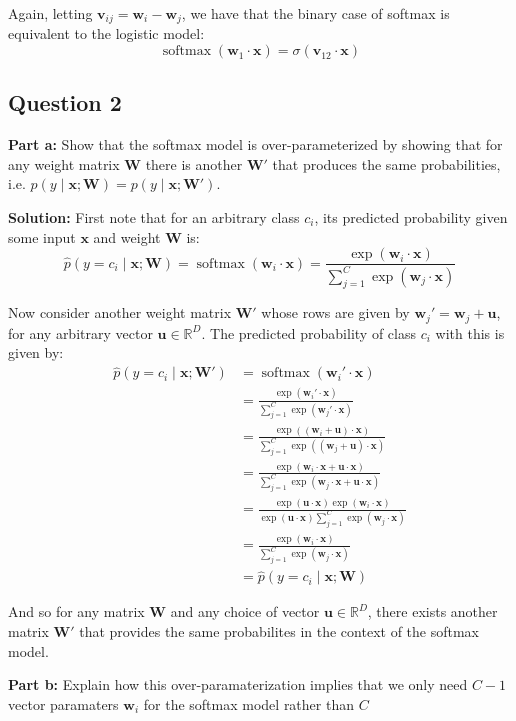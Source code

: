 \documentclass{article}
\renewcommand{\vec}[1]{\mathbf{#1}}
\newcommand{\mat}[1]{\mathbf{#1}}
\begin{document}
Again, letting $\vec v_{ij}=\vec w_i - \vec w_j$, we have that the binary case of softmax is equivalent to the logistic model:
$$\operatorname{softmax}(\vec w_1\cdot\vec x)=\sigma(\vec v_{12}\cdot \vec x)$$

\subsection*{Question 2}
\noindent\textbf{Part a:} Show that the softmax model is over-parameterized by showing that for any weight matrix $\mat W$ there is another $\mat W'$ that produces the same probabilities, i.e. $p(y\mid\vec x; \mat W)=p(y\mid\vec x; \mat W')$.
\bigskip

\noindent\textbf{Solution:} First note that for an arbitrary class $c_i$, its predicted probability given some input $\vec x$ and weight $\mat W$ is:
$$\hat p(y=c_i\mid\vec x;\mat W)=\operatorname{softmax}(\vec w_i\cdot\vec x)=\frac{\exp(\vec w_i\cdot\vec x)}{\sum_{j=1}^C\exp(\vec w_j\cdot\vec x)}$$

Now consider another weight matrix $\mat W'$ whose rows are given by $\vec w_j'=\vec w_j+\vec u$, for any arbitrary vector $\vec u\in\mathbb R^D$. The predicted probability of class $c_i$ with this is given by:
\begin{align*}
    \hat p(y=c_i\mid\vec x;\mat W')&=\operatorname{softmax}(\vec w_i'\cdot\vec x)\\
    &=\frac{\exp(\vec w_i'\cdot\vec x)}{\sum_{j=1}^C\exp(\vec w_j'\cdot\vec x)}\\
    &=\frac{\exp((\vec w_i+\vec u)\cdot\vec x)}{\sum_{j=1}^C\exp((\vec w_j+\vec u)\cdot\vec x)}\\
    &=\frac{\exp(\vec w_i\cdot\vec x+\vec u\cdot\vec x)}{\sum_{j=1}^C\exp(\vec w_j\cdot\vec x+\vec u\cdot\vec x)}\\
    &=\frac{\exp(\vec u\cdot\vec x)\exp(\vec w_i\cdot\vec x)}{\exp(\vec u\cdot\vec x)\sum_{j=1}^C\exp(\vec w_j\cdot\vec x)}\\
    &=\frac{\exp(\vec w_i\cdot\vec x)}{\sum_{j=1}^C\exp(\vec w_j\cdot\vec x)}\\
    &=\hat p(y=c_i\mid\vec x;\mat W)
\end{align*}

And so for any matrix $\mat W$ and any choice of vector $\vec u\in\mathbb R^D$, there exists another matrix $\mat W'$ that provides the same probabilites in the context of the softmax model.
\bigskip

\noindent\textbf{Part b:} Explain how this over-paramaterization implies that we only need $C-1$ vector paramaters $\vec w_i$ for the softmax model rather than $C$
\bigskip
\end{document}
